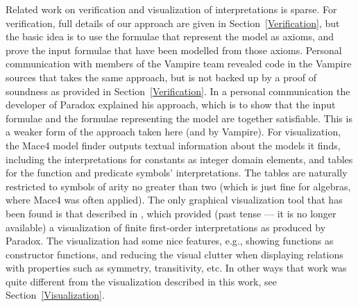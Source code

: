 \documentclass[letterpaper]{article}
\begin{document}
Related work on verification and visualization of interpretations is sparse.
For verification, full details of our approach are given in Section~\ref{Verification}, but
the basic idea is to use the formulae that represent the model as axioms, and prove the 
input formulae that have been modelled from those axioms.
Personal communication with members of the Vampire team revealed code in the Vampire sources 
that takes the same approach, but is not backed up by a proof of soundness as provided in 
Section~\ref{Verification}.
In a personal communication the developer of Paradox explained his approach, which is to show
that the input formulae and the formulae representing the model are together satisfiable.
This is a weaker form of the approach taken here (and by Vampire).
For visualization, the Mace4 model finder \cite{McC03-MACE4-TR} outputs textual information about 
the models it finds, including the interpretations for constants as integer domain elements, and 
tables for the function and predicate symbols' interpretations. 
The tables are naturally restricted to symbols of arity no greater than two (which is just fine
for algebras, where Mace4 was often applied).
The only graphical visualization tool that has been found is that described in \cite{Sch13-MS},
which provided (past tense --- it is no longer available) a visualization of finite first-order 
interpretations as produced by Paradox.
The visualization had some nice features, e.g., showing functions as constructor functions, and 
reducing the visual clutter when displaying relations with properties such as symmetry, 
transitivity, etc.
In other ways that work was quite different from the visualization described in this work,
see Section~\ref{Visualization}.

\end{document}
